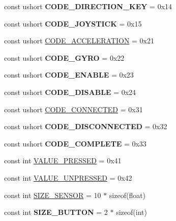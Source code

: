 \begin{DoxyCompactItemize}
\item 
\hypertarget{class_g_cconst_ab69f6e01d674019db0d5a229b157cad6}{}const ushort {\bfseries C\+O\+D\+E\+\_\+\+D\+I\+R\+E\+C\+T\+I\+O\+N\+\_\+\+K\+E\+Y} = 0x14\label{class_g_cconst_ab69f6e01d674019db0d5a229b157cad6}

\item 
\hypertarget{class_g_cconst_a65914551560b5254e65f35a8668e4dff}{}const ushort {\bfseries C\+O\+D\+E\+\_\+\+J\+O\+Y\+S\+T\+I\+C\+K} = 0x15\label{class_g_cconst_a65914551560b5254e65f35a8668e4dff}

\item 
const ushort \hyperlink{class_g_cconst_a84fdd379bbb0355e8d1abec0338c7305}{C\+O\+D\+E\+\_\+\+A\+C\+C\+E\+L\+E\+R\+A\+T\+I\+O\+N} = 0x21
\item 
\hypertarget{class_g_cconst_afdbe82aacd4ebe510c3f8ddaa609b42b}{}const ushort {\bfseries C\+O\+D\+E\+\_\+\+G\+Y\+R\+O} = 0x22\label{class_g_cconst_afdbe82aacd4ebe510c3f8ddaa609b42b}

\item 
\hypertarget{class_g_cconst_a4de99e7f693ef24b6ebe035e667ab9a9}{}const ushort {\bfseries C\+O\+D\+E\+\_\+\+E\+N\+A\+B\+L\+E} = 0x23\label{class_g_cconst_a4de99e7f693ef24b6ebe035e667ab9a9}

\item 
\hypertarget{class_g_cconst_a05ddc5a5f4e3edf50dc805700da2f064}{}const ushort {\bfseries C\+O\+D\+E\+\_\+\+D\+I\+S\+A\+B\+L\+E} = 0x24\label{class_g_cconst_a05ddc5a5f4e3edf50dc805700da2f064}

\item 
const ushort \hyperlink{class_g_cconst_a03588045b902424b55b70524bd81a7d0}{C\+O\+D\+E\+\_\+\+C\+O\+N\+N\+E\+C\+T\+E\+D} = 0x31
\item 
\hypertarget{class_g_cconst_a484076ed934580daba95f65bd86d6c25}{}const ushort {\bfseries C\+O\+D\+E\+\_\+\+D\+I\+S\+C\+O\+N\+N\+E\+C\+T\+E\+D} = 0x32\label{class_g_cconst_a484076ed934580daba95f65bd86d6c25}

\item 
\hypertarget{class_g_cconst_ae0d7a3f3581392fcfbab6ed03a738287}{}const ushort {\bfseries C\+O\+D\+E\+\_\+\+C\+O\+M\+P\+L\+E\+T\+E} = 0x33\label{class_g_cconst_ae0d7a3f3581392fcfbab6ed03a738287}

\item 
const int \hyperlink{class_g_cconst_ab29addae403721e28db58d3d588d7cb6}{V\+A\+L\+U\+E\+\_\+\+P\+R\+E\+S\+S\+E\+D} = 0x41
\item 
const int \hyperlink{class_g_cconst_ae71573553c10f6fa0dce4c8ef2a27e10}{V\+A\+L\+U\+E\+\_\+\+U\+N\+P\+R\+E\+S\+S\+E\+D} = 0x42
\item 
const int \hyperlink{class_g_cconst_a13a353e3da52e3a0454487664c360dab}{S\+I\+Z\+E\+\_\+\+S\+E\+N\+S\+O\+R} = 10 $\ast$ sizeof(float)
\item 
\hypertarget{class_g_cconst_aab30a3dfdb77464086d7198f78bdbde3}{}const int {\bfseries S\+I\+Z\+E\+\_\+\+B\+U\+T\+T\+O\+N} = 2 $\ast$ sizeof(int)\label{class_g_cconst_aab30a3dfdb77464086d7198f78bdbde3}


\end{DoxyCompactItemize}
